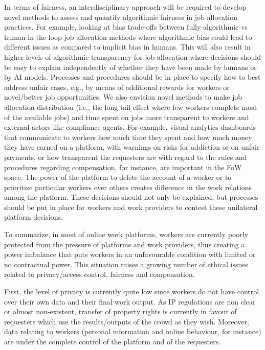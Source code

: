 \documentclass[11pt]{article}
\begin{document}
In terms of fairness, an interdisciplinary approach will be required to develop novel methods to assess and quantify algorithmic fairness in job allocation practices. For example, looking at bias trade-offs between fully-algorithmic vs human-in-the-loop job allocation methods where algorithmic bias could lead to different issues as compared to implicit bias in humans.
This will also result in higher levels of algorithmic transparency for job allocation where decisions should be easy to explain independently of whether they have been made by humans or by AI models.
Processes and procedures should be in place to specify how to best address unfair cases, e.g., by means of additional rewards for workers or novel/better job opportunities. We also envision novel methods to make job allocation distribution (i.e., the long tail effect where few workers complete most of the available jobs) and time spent on jobs more transparent to workers and external actors like compliance agents. For example, visual analytics dashboards that communicate to workers how much time they spent and how much money they have earned on a platform, with warnings on risks for addiction or on unfair payments, or how transparent the requesters are with regard to the rules and procedures regarding compensation, for instance, are important in the FoW space. The power of the platform to delete the account of a worker  or to prioritize particular workers over others  creates difference in the work relations among the platform. These decisions should not only be explained, but processes should be put in place for workers and work providers to contest these unilateral platform decisions.



To summarize, in most of online work platforms, workers are currently poorly protected from the pressure of platforms and work providers, thus creating a power imbalance that puts workers in an unfavourable condition with limited or no contractual power.  This situation raises a growing number of ethical issues related to privacy/access control, fairness and compensation. 

First, the level of privacy is currently quite low since workers do not have control over their own data and their final work output. As IP regulations are non clear or almost non-existent, transfer of property rights is currently in favour of requesters which use the results/outputs of the crowd as they wish. Moreover, data relating to workers (personal information and online behaviour, for instance) are under the complete control of the platform and of the requesters.
\end{document}
